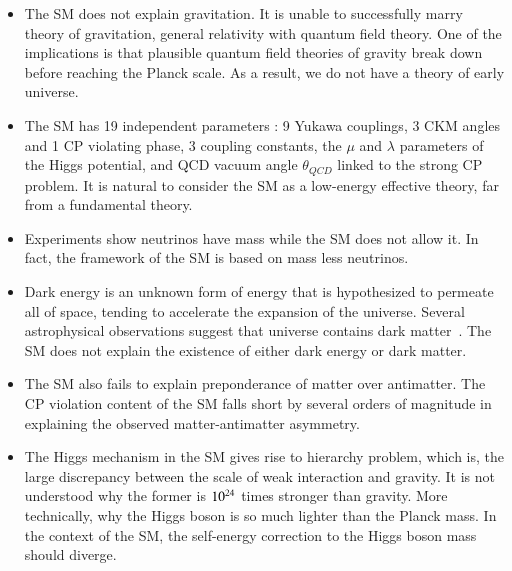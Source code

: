 \begin{itemize}



\item The SM does not explain gravitation. It is unable to successfully marry  theory of gravitation, general relativity with quantum field theory. One of the implications is that plausible quantum field theories of gravity break down before reaching the Planck scale. As a result, we do not have a theory of early universe. 

\item The SM has 19 independent parameters : 9 Yukawa couplings, 3 CKM angles and 1 CP violating phase, 3 coupling constants, the $\mu$ and $\lambda$ parameters of the Higgs potential, and QCD vacuum angle $\theta_{QCD}$ linked to the strong CP problem. It is natural to consider the SM as a low-energy effective theory, far from a fundamental theory.

\item Experiments show neutrinos have mass while the SM does not allow it. In fact, the framework of the SM is based on mass less neutrinos.

\item Dark energy is an unknown form of energy that is hypothesized to permeate all of space, tending to accelerate the expansion of the universe. Several astrophysical observations suggest that universe contains dark matter~\cite{DarkMatter}. The SM does not explain the existence of either dark energy or dark matter.

\item The SM also fails to explain preponderance of matter over antimatter. The CP violation content of the SM falls short by several orders of magnitude in explaining the observed matter-antimatter asymmetry.

\item The Higgs mechanism in the SM gives rise to hierarchy problem, which is, the large discrepancy between the scale of weak interaction and gravity. It is not understood why the former is $\rm 10^{24}$ times stronger than gravity. More technically, why the Higgs boson is so much lighter than the Planck mass. In the context of the SM, the self-energy correction to the Higgs boson mass should diverge.

\end{itemize}





%
